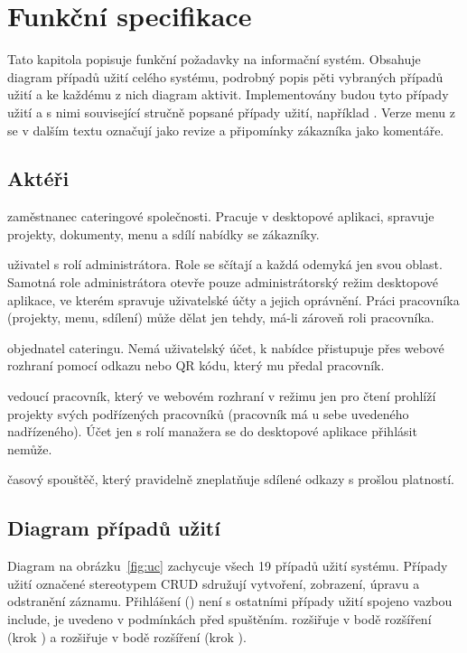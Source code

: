 \section{Funkční specifikace}\label{sec:funk}

Tato kapitola popisuje funkční požadavky na informační systém. Obsahuje diagram případů užití celého systému, podrobný popis pěti vybraných případů užití a ke každému z nich diagram aktivit. Implementovány budou tyto případy užití a s nimi související stručně popsané případy užití, například . Verze menu z  se v dalším textu označují jako revize a připomínky zákazníka jako komentáře.

\subsection{Aktéři}

\begin{description}[itemsep=2pt]
  \item[Pracovník] zaměstnanec cateringové společnosti. Pracuje v desktopové aplikaci, spravuje projekty, dokumenty, menu a sdílí nabídky se zákazníky.
  \item[Administrátor] uživatel s rolí administrátora. Role se sčítají a každá odemyká jen svou oblast. Samotná role administrátora otevře pouze administrátorský režim desktopové aplikace, ve kterém spravuje uživatelské účty a jejich oprávnění. Práci pracovníka (projekty, menu, sdílení) může dělat jen tehdy, má-li zároveň roli pracovníka.
  \item[Zákazník] objednatel cateringu. Nemá uživatelský účet, k nabídce přistupuje přes webové rozhraní pomocí odkazu nebo QR kódu, který mu předal pracovník.
  \item[Manažer] vedoucí pracovník, který ve webovém rozhraní v režimu jen pro čtení prohlíží projekty svých podřízených pracovníků (pracovník má u sebe uvedeného nadřízeného). Účet jen s rolí manažera se do desktopové aplikace přihlásit nemůže.
  \item[Čas] časový spouštěč, který pravidelně zneplatňuje sdílené odkazy s prošlou platností.
\end{description}

\subsection{Diagram případů užití}

Diagram na obrázku~\ref{fig:uc} zachycuje všech 19 případů užití systému. Případy užití označené stereotypem \guillemotleft CRUD\guillemotright{} sdružují vytvoření, zobrazení, úpravu a odstranění záznamu. Přihlášení () není s ostatními případy užití spojeno vazbou \guillemotleft include\guillemotright, je uvedeno v podmínkách před spuštěním.  rozšiřuje  v bodě rozšíření  (krok ) a  rozšiřuje  v bodě rozšíření  (krok ).

